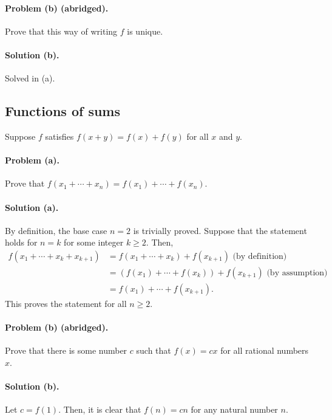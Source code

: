 \documentclass{article}
\begin{document}
\paragraph{Problem (b) (abridged).} Prove that this way of writing $f$ is unique.

\paragraph{Solution (b).} Solved in (a).

\setcounter{subsection}{15}
\subsection{Functions of sums}

Suppose $f$ satisfies $f(x + y) = f(x) + f(y)$ for all $x$ and $y$.

\paragraph{Problem (a).} Prove that $f(x_1 + \cdots + x_n) = f(x_1) + \cdots + f(x_n)$.

\paragraph{Solution (a).} By definition, the base case $n = 2$ is trivially proved. Suppose that the statement holds for $n = k$ for some integer $k \geq 2$. Then, \begin{align*}
  f(x_1 + \cdots + x_k + x_{k+1}) &= f(x_1 + \cdots + x_k) + f(x_{k+1}) \text{ (by definition)} \\
                                  &= (f(x_1) + \cdots + f(x_k)) + f(x_{k+1}) \text{ (by assumption)} \\
                                  &= f(x_1) + \cdots + f(x_{k+1}).
\end{align*} This proves the statement for all $n \geq 2$.

\paragraph{Problem (b) (abridged).} Prove that there is some number $c$ such that $f(x) = cx$ for all rational numbers $x$.

\paragraph{Solution (b).} Let $c = f(1)$. Then, it is clear that $f(n) = cn$ for any natural number $n$.
\end{document}
